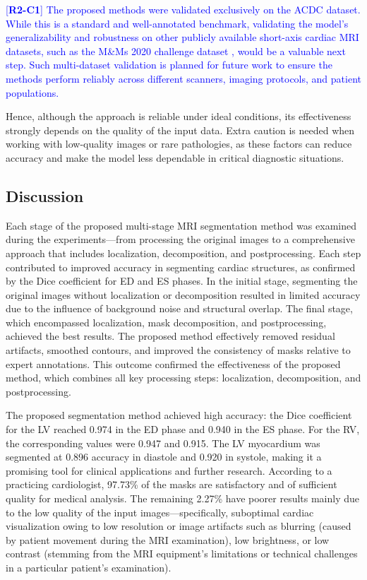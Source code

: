 \documentclass[fleqn,10pt]{wlscirep}
\newcommand{\revtag}[2]{[\textbf{R#1-C#2}]}
\newcommand{\Rtwo}[1]{\textcolor{blue}{#1}}
\begin{document}
\Rtwo{\revtag{2}{1} The proposed methods were validated exclusively on the ACDC dataset. While this is a standard and well-annotated benchmark, validating the model's generalizability and robustness on other publicly available short-axis cardiac MRI datasets, such as the M\&Ms 2020 challenge dataset \cite{Campello:2021}, would be a valuable next step. Such multi-dataset validation is planned for future work to ensure the methods perform reliably across different scanners, imaging protocols, and patient populations.}

Hence, although the approach is reliable under ideal conditions, its effectiveness strongly depends on the quality of the input data. Extra caution is needed when working with low-quality images or rare pathologies, as these factors can reduce accuracy and make the model less dependable in critical diagnostic situations.

\subsection*{Discussion}

Each stage of the proposed multi-stage MRI segmentation method was examined during the experiments---from processing the original images to a comprehensive approach that includes localization, decomposition, and postprocessing. Each step contributed to improved accuracy in segmenting cardiac structures, as confirmed by the Dice coefficient for ED and ES phases. In the initial stage, segmenting the original images without localization or decomposition resulted in limited accuracy due to the influence of background noise and structural overlap. The final stage, which encompassed localization, mask decomposition, and postprocessing, achieved the best results. The proposed method effectively removed residual artifacts, smoothed contours, and improved the consistency of masks relative to expert annotations. This outcome confirmed the effectiveness of the proposed method, which combines all key processing steps: localization, decomposition, and postprocessing.

The proposed segmentation method achieved high accuracy: the Dice coefficient for the LV reached 0.974 in the ED phase and 0.940 in the ES phase. For the RV, the corresponding values were 0.947 and 0.915. The LV myocardium was segmented at 0.896 accuracy in diastole and 0.920 in systole, making it a promising tool for clinical applications and further research. According to a practicing cardiologist, 97.73\% of the masks are satisfactory and of sufficient quality for medical analysis. The remaining 2.27\% have poorer results mainly due to the low quality of the input images---specifically, suboptimal cardiac visualization owing to low resolution or image artifacts such as blurring (caused by patient movement during the MRI examination), low brightness, or low contrast (stemming from the MRI equipment's limitations or technical challenges in a particular patient's examination).
\end{document}
